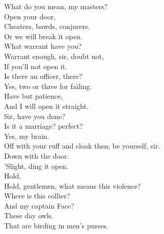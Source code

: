 \documentclass[a4paper,oneside]{memoir}
\begin{document}
\begin{drama*}
\lovewitspeaks What do you mean, my masters?\\
\mammonspeaks {}  Open your door,\\
Cheaters, bawds, conjurers.\\
\officeronespeaks {}  Or we will break it open.\\
\lovewitspeaks What warrant have you?\\
\officeronespeaks {}  Warrant enough, sir, doubt not,\\
If you'll not open it.\\
\lovewitspeaks {} Is there an officer, there?\\
\officeronespeaks {} Yes, two or three for failing.\\
\lovewitspeaks {} Have but patience,\\
And I will open it straight.\\
\facespeaks {} Sir, have you done?\\
Is it a marriage? perfect?\\
\lovewitspeaks {} Yes, my brain.\\
\facespeaks Off with your ruff and cloak then; be yourself, sir.\\
\surlyspeaks {} Down with the door.\\
\kastrilspeaks {}  'Slight, ding it open.\\
\lovewitspeaks {}  Hold,\\
Hold, gentlemen, what means this violence?\\
\mammonspeaks Where is this collier?\\
\surlyspeaks {} And my captain Face?\\
\mammonspeaks These day owls.\\
\surlyspeaks {} That are birding in men's purses.\\

\end{drama*}
\end{document}

